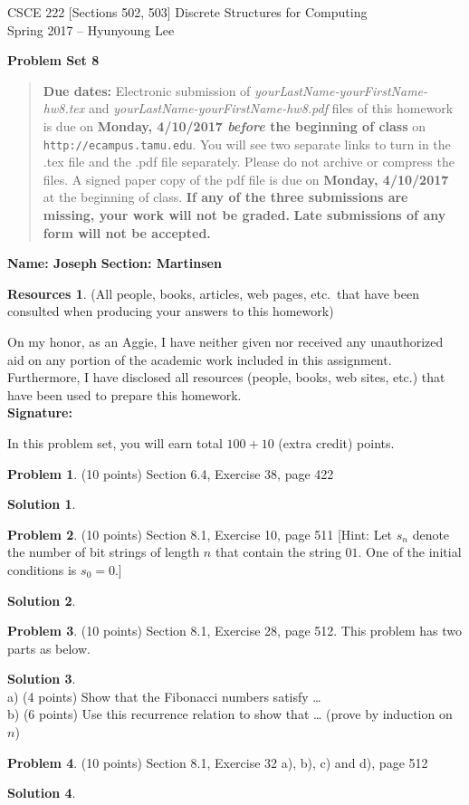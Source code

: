 \documentclass{article}
\theoremstyle{definition}
\newtheorem{problem}{Problem}
\newtheorem*{solution}{Solution}
\newtheorem*{resources}{Resources}
\newcommand{\name}[2]{\noindent\textbf{Name: #1}\hfill \textbf{Section: #2}}
\newcommand{\honor}{\noindent On my honor, as an Aggie, I have neither
  given nor received any unauthorized aid on any portion of the
  academic work included in this assignment. Furthermore, I have
  disclosed all resources (people, books, web sites, etc.) that have
  been used to prepare this homework. \\[2ex]
 \textbf{Signature:} \underline{\hspace*{8cm}} }
\newcommand{\problemset}[1]{\begin{center}\textbf{Problem Set #1}\end{center}}
\newcommand{\duedate}[2]{\begin{quote}\textbf{Due dates:} Electronic
    submission of \textsl{yourLastName-yourFirstName-hw8.tex} and 
    \textsl{yourLastName-yourFirstName-hw8.pdf} files of this homework is due on
    \textbf{#1} on \texttt{http://ecampus.tamu.edu}. You will see two separate links
    to turn in the .tex file and the .pdf file separately. Please do not archive or compress the files.  
    A signed paper copy of the pdf file is due on \textbf{#2} at the beginning of class.
    \textbf{If any of the three submissions are missing, your work will not be graded.}
    \textbf{Late submissions of any form will not be accepted.}\end{quote} }
\begin{document}
\vspace*{-18mm}
\begin{center}
{\large
CSCE 222 [Sections 502, 503] Discrete Structures for Computing\\[.5ex]
Spring 2017 -- Hyunyoung Lee\\}
\end{center}
\problemset{8}
\duedate{Monday, 4/10/2017 \textit{before} the beginning of class}{Monday, 4/10/2017}
\name{ Joseph }{Martinsen}
\begin{resources} (All people, books, articles, web pages, etc.\ that
  have been consulted when producing your answers to this homework)
\end{resources}
\honor

\bigskip

\noindent
In this problem set, you will earn total $100+10$ (extra credit) points.

\begin{problem} (10 points)
Section 6.4, Exercise 38, page 422
\end{problem}
\begin{solution} 
\end{solution}

\begin{problem} (10 points)
Section 8.1, Exercise 10, page 511
[Hint: Let $s_n$ denote the number of bit strings of length $n$ that
contain the string $01$. One of the initial conditions is $s_0 = 0$.] 
\end{problem}
\begin{solution} 
\end{solution}

\begin{problem} (10 points)
Section 8.1, Exercise 28, page 512. This problem has two parts as below. 
\end{problem}
\begin{solution} 
\ \\
a) (4 points) Show that the Fibonacci numbers satisfy \ldots
\ \\
b) (6 points) Use this recurrence relation to show that \ldots 
(prove by induction on $n$)
\end{solution}

\begin{problem} (10 points)
Section 8.1, Exercise 32 a), b), c) and d), page 512
\end{problem}
\begin{solution} 
\end{solution}
\end{document}
